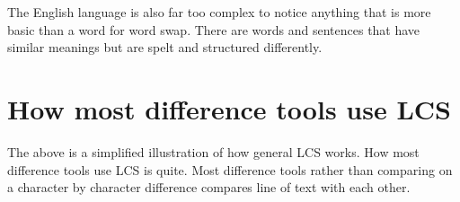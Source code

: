 The English language is also far too complex to notice anything that is more basic than a word for word swap.
There are words and sentences that have similar meanings but are spelt and structured differently.

\section{How most difference tools use LCS}
The above is a simplified illustration of how general LCS works.
How most difference tools use LCS is quite.
Most difference tools rather than comparing on a character by character difference compares line of text with each other.

% 
 
 


